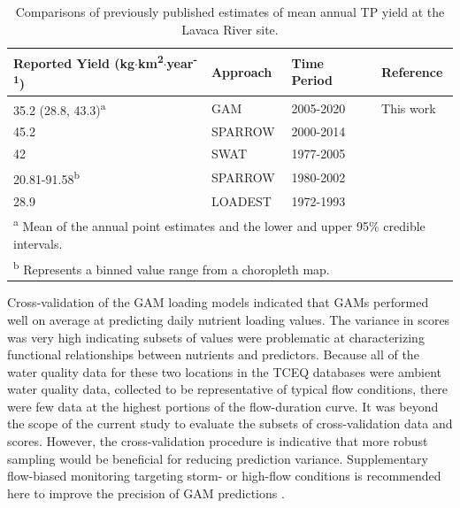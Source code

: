 \documentclass[sn-basic,referee,lineno,pdflatex]{sn-jnl}
\begin{document}
\begin{table}

\caption{\label{tab:table5}Comparisons of previously published estimates of mean annual TP yield at the Lavaca River site.}
\centering
\begin{tabular}[t]{llll}
\toprule
Reported Yield (kg$\cdot$km\textsuperscript{2}$\cdot$year\textsuperscript{-1}) & Approach & Time Period & Reference\\
\midrule
35.2 (28.8, 43.3)\textsuperscript{a} & GAM & 2005-2020 & This work\\
45.2 & SPARROW & 2000-2014 & \cite{wise_spatially_2019}\\
42 & SWAT & 1977-2005 & \cite{omaniEstimationSedimentNutrient2014}\\
20.81-91.58\textsuperscript{b} & SPARROW & 1980-2002 & \cite{rebichSourcesDeliveryNutrients2011}\\
28.9 & LOADEST & 1972-1993 & \cite{dunnTrendsNutrientInflows1996}\\
\bottomrule
\multicolumn{4}{l}{\rule{0pt}{1em}\textsuperscript{a} Mean of the annual point estimates and the lower and upper 95\% credible intervals.}\\
\multicolumn{4}{l}{\rule{0pt}{1em}\textsuperscript{b} Represents a binned value range from a choropleth map.}\\
\end{tabular}
\end{table}

Cross-validation of the GAM loading models indicated that GAMs performed
well on average at predicting daily nutrient loading values. The
variance in scores was very high indicating subsets of values were
problematic at characterizing functional relationships between nutrients
and predictors. Because all of the water quality data for these two
locations in the TCEQ databases were ambient water quality data,
collected to be representative of typical flow conditions, there were
few data at the highest portions of the flow-duration curve. It was
beyond the scope of the current study to evaluate the subsets of
cross-validation data and scores. However, the cross-validation
procedure is indicative that more robust sampling would be beneficial
for reducing prediction variance. Supplementary flow-biased monitoring
targeting storm- or high-flow conditions is recommended here to improve
the precision of GAM predictions
\citep{horowitzEvaluationSedimentRating2003, snelderEstimationCatchmentNutrient2017}.
\end{document}

